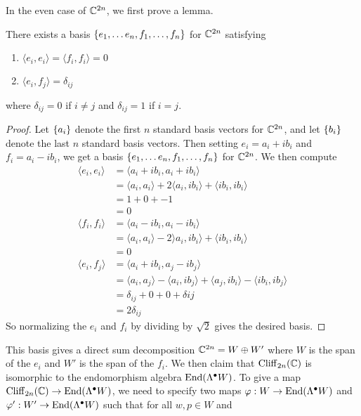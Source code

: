In the even case of $\mathbb{C}^{2n}$, we first prove a lemma.
%
\begin{lem}
There exists a basis $\left\lbrace e_1,\ldots e_n, f_1, \ldots, f_n \right\rbrace$ for $\mathbb{C}^{2n}$
satisfying
\begin{enumerate}
  \item $\langle e_i, e_i \rangle = \langle f_i, f_i \rangle = 0$
  \item $\langle e_i, f_j \rangle = \delta_{ij}$
\end{enumerate}
where $\delta_{ij} = 0$ if $i \neq j$ and $\delta_{ij} = 1$ if $i = j$.
\end{lem}
%
\begin{proof}
Let $\left\lbrace a_i \right\rbrace$ denote the first $n$ standard basis vectors for $\mathbb{C}^{2n}$, and let
$\left\lbrace b_i \right\rbrace$ denote the last $n$ standard basis vectors. Then setting
$e_i = a_i + ib_i$ and $f_i = a_i - ib_i$, we get a basis
$\left\lbrace e_1, \ldots e_n, f_1, \ldots, f_n \right\rbrace$ for $\mathbb{C}^{2n}$. We then compute
%
\begin{align*}
\langle e_i, e_i \rangle &=\langle a_i + ib_i, a_i + ib_i \rangle \\
&= \langle a_i, a_i \rangle +2\langle a_i, ib_i \rangle + \langle ib_i, ib_i \rangle \\
&= 1 + 0 + -1 \\
&= 0 \\
\langle f_i, f_i \rangle &= \langle a_i - ib_i, a_i - ib_i \rangle \\
&= \langle a_i,a_i \rangle -2\rangle a_i, ib_i \rangle + \langle ib_i,ib_i\rangle \\
&= 0 \\
\langle e_i, f_j \rangle &= \langle a_i + ib_i, a_j - ib_j \rangle \\
&= \langle a_i,a_j \rangle - \langle a_i,ib_j \rangle + \langle a_j, ib_i \rangle
- \langle ib_i, ib_j \rangle \\
&= \delta_{ij} + 0 + 0 + \delta{ij} \\
&= 2\delta_{ij}
\end{align*}
So normalizing the $e_i$ and $f_i$ by dividing by $\sqrt{2}$ gives the desired basis.
%
\end{proof}
%
This basis gives a direct sum decomposition $\mathbb{C}^{2n} = W \oplus W'$ where
$W$ is the span of the $e_i$ and $W'$ is the span of the $f_i$. We then claim
that $\operatorname{Cliff}_{2n}(\mathbb{C})$ is isomorphic to the endomorphism algebra
$\operatorname{End}(\Lambda^\bullet W)$. To give a map $\operatorname{Cliff}_{2n}(\mathbb{C}) \to
\operatorname{End}(\Lambda^\bullet W)$, we need to specify two maps
$\varphi : W \to \operatorname{End}(\Lambda^\bullet W)$ and
$\varphi' : W' \to \operatorname{End}(\Lambda^\bullet W)$ such that for all $w,p \in W$ and
